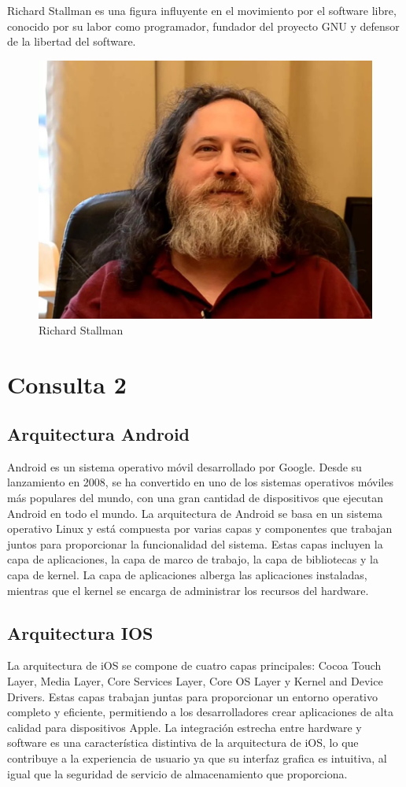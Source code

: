 \documentclass[11pt,twoside]{book}
\begin{document}
\vspace{5pt}
Richard Stallman es una figura influyente en el movimiento por el software libre, conocido por su labor como programador, fundador del proyecto GNU y defensor de la libertad del software.

\begin{figure}[htb]
  \centering
  \includegraphics[width=0.3\linewidth]{R.S.1.png}
  \caption{Richard Stallman}
  \label{fig:etiqueta}
\end{figure}
\vspace{5pt}
\newpage

\section{Consulta 2}
\subsection{Arquitectura Android}
Android es un sistema operativo móvil desarrollado por Google. Desde su lanzamiento en 2008, se ha convertido en uno de los sistemas operativos móviles más populares del mundo, con una gran cantidad de dispositivos que ejecutan Android en todo el mundo.
La arquitectura de Android se basa en un sistema operativo Linux y está compuesta por varias capas y componentes que trabajan juntos para proporcionar la funcionalidad del sistema. Estas capas incluyen la capa de aplicaciones, la capa de marco de trabajo, la capa de bibliotecas y la capa de kernel. La capa de aplicaciones alberga las aplicaciones instaladas, mientras que el kernel se encarga de administrar los recursos del hardware.

\subsection{Arquitectura IOS}
La arquitectura de iOS se compone de cuatro capas principales: Cocoa Touch Layer, Media Layer, Core Services Layer, Core OS Layer y Kernel and Device Drivers. Estas capas trabajan juntas para proporcionar un entorno operativo completo y eficiente, permitiendo a los desarrolladores crear aplicaciones de alta calidad para dispositivos Apple. La integración estrecha entre hardware y software es una característica distintiva de la arquitectura de iOS, lo que contribuye a la experiencia de usuario ya que su interfaz grafica es intuitiva, al igual que la seguridad de servicio de almacenamiento que proporciona. 
\end{document}
